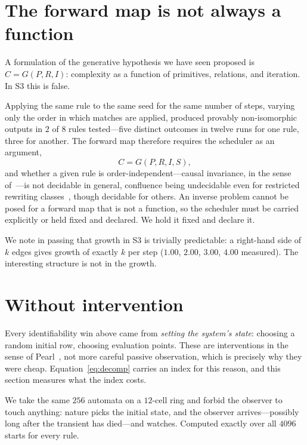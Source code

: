 \documentclass[11pt]{article}
\begin{document}
\section{The forward map is not always a function}\label{sec:scheduler}

A formulation of the generative hypothesis we have seen proposed is $C=G(P,R,I)$:
complexity as a function of primitives, relations, and iteration. In S3 this is false.

Applying the same rule to the same seed for the same number of steps, varying only the
order in which matches are applied, produced provably non-isomorphic outputs in $2$ of
$8$ rules tested---five distinct outcomes in twelve runs for one rule, three for
another. The forward map therefore requires the scheduler as an argument,
\[
  C = G(P,R,I,S),
\]
and whether a given rule is order-independent---causal invariance, in the sense
of~\cite{wolfram2020}---is not decidable in general, confluence being undecidable even for
restricted rewriting classes~\cite{jacquemard2003}, though decidable for others. An inverse problem cannot be posed
for a forward map that is not a function, so the scheduler must be carried explicitly
or held fixed and declared. We hold it fixed and declare it.

We note in passing that growth in S3 is trivially predictable: a right-hand side of $k$
edges gives growth of exactly $k$ per step ($1.00$, $2.00$, $3.00$, $4.00$ measured).
The interesting structure is not in the growth.

\section{Without intervention}\label{sec:passive}

Every identifiability win above came from \emph{setting the system's state}: choosing a
random initial row, choosing evaluation points. These are interventions in the sense of
Pearl~\cite{pearl2009}, not more careful passive observation, which is precisely why
they were cheap. Equation~\eqref{eq:decomp} carries an index for this reason, and this
section measures what the index costs.

We take the same $256$ automata on a $12$-cell ring and forbid the observer to touch
anything: nature picks the initial state, and the observer arrives---possibly long
after the transient has died---and watches. Computed exactly over all $4096$ starts for
every rule.
\end{document}
